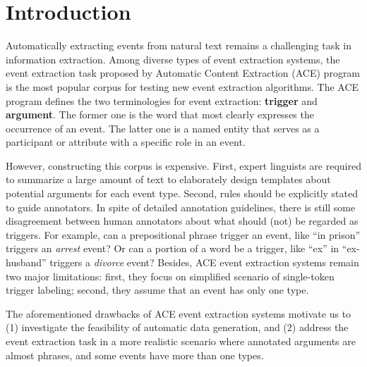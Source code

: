 \section{Introduction}
Automatically extracting events from natural text remains a challenging task in information extraction. Among diverse types of event extraction systems, the event extraction task proposed by Automatic Content Extraction (ACE) \cite{doddington2004automatic} program is the most popular corpus for testing new event extraction algorithms. The ACE program defines the two terminologies for event extraction: \textbf{trigger} and \textbf{argument}. The former one is the word that most clearly expresses the occurrence of an event. The latter one is a named entity that serves as a participant or attribute with a specific role in an event.

However, constructing this corpus is expensive. First, expert linguists are required to summarize a large amount of text to elaborately design templates about potential arguments for each event type. Second, rules should be explicitly stated to guide annotators. In spite of detailed annotation guidelines, there is still some disagreement between human annotators about what should (not) be regarded as triggers. For example, can a prepositional phrase trigger an event, like ``in prison'' triggers an \emph{arrest} event? Or can a portion of a word be a trigger, like ``ex'' in ``ex-husband'' triggers a \emph{divorce} event?
Besides, ACE event extraction systems remain two major limitations:  first, they focus on simplified scenario of single-token trigger labeling; second, they assume that an event has only one type.

The aforementioned drawbacks of ACE event extraction systems motivate us to (1) investigate the feasibility of automatic data generation, and (2) address the event extraction task in a more realistic scenario where annotated arguments are almost phrases, and some events have more than one types.

